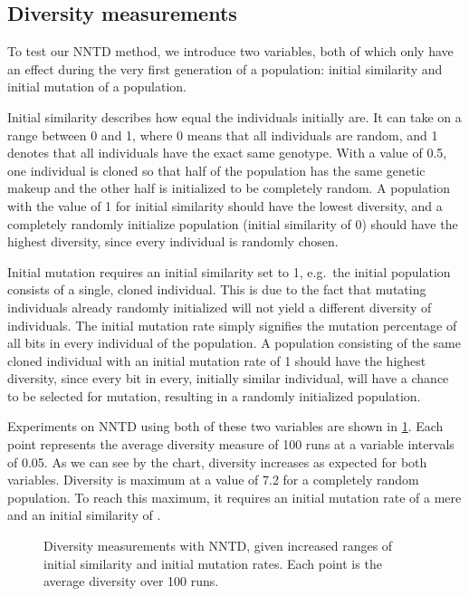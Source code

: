 \subsection{Diversity measurements}
To test our NNTD method, we introduce two variables, both of which only have an effect during the very first generation of a population: initial similarity and initial mutation of a population. 

Initial similarity describes how equal the individuals initially are. It can take on a range between \num{0} and \num{1}, where \num{0} means that all individuals are random, and \num{1} denotes that  all individuals have the exact same genotype. With a value of \num{0.5}, one individual is cloned so that half of the population has the same genetic makeup and the other half is initialized to be completely random. A population with the value of \num{1} for initial similarity should have the lowest diversity, and a completely randomly initialize population (initial similarity of \num{0}) should have the highest diversity, since every individual is randomly chosen.

Initial mutation requires an initial similarity set to \num{1}, e.g.\ the initial population consists of a single, cloned individual. This is due to the fact that mutating individuals already randomly initialized will not yield a different diversity of individuals. The initial mutation rate simply signifies the mutation percentage of all bits in every individual of the population. A population consisting of the same cloned individual with an initial mutation rate of \num{1} should have the highest diversity, since every bit in every, initially similar individual, will have a  chance to be selected for mutation, resulting in a randomly initialized population.

Experiments on NNTD using both of these two variables are shown in \cref{fig:initial-mutation-similarity}. Each point represents the average diversity measure of \num{100} runs at a variable intervals of \num{0.05}. As we can see by the chart, diversity increases as expected for both variables. Diversity is maximum at a value of \num{7.2} for a completely random population. To reach this maximum, it requires an initial mutation rate of a mere  and an initial similarity of .

\begin{figure}[htpb]
  \centering
  \caption{Diversity measurements with NNTD, given increased ranges of initial similarity and initial mutation rates. Each point is the average diversity over \num{100} runs.}\label{fig:initial-mutation-similarity}
\end{figure}
